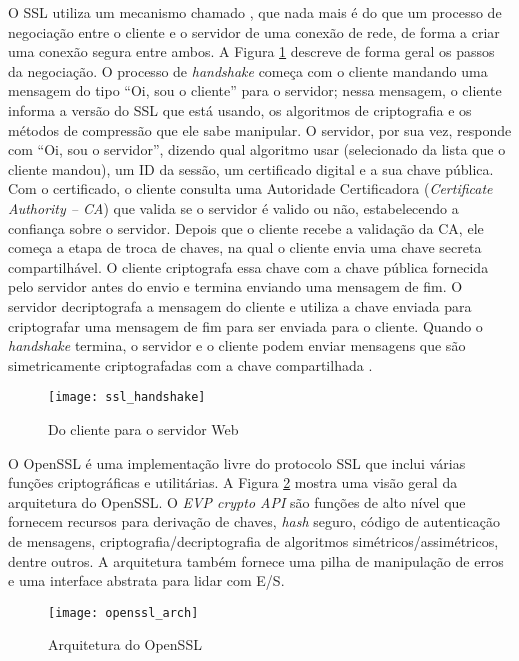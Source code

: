 O SSL utiliza um mecanismo chamado , que
nada mais é do que um processo de negociação entre o cliente e o servidor de uma conexão de rede, de
forma a criar uma conexão segura entre ambos. A Figura
\ref{fig:openssl_handshake} descreve de forma geral os passos da negociação. O
processo de \emph{handshake} começa com o cliente mandando uma mensagem do
tipo ``Oi, sou o cliente'' para o servidor; nessa mensagem, o cliente informa a
versão do SSL que está usando, os algoritmos de criptografia e os métodos de
compressão que ele sabe manipular. O servidor, por sua vez, responde com ``Oi, sou o
servidor'', dizendo qual algoritmo usar (selecionado da lista que o cliente
mandou), um ID da sessão, um certificado digital e a sua chave pública. Com o
certificado, o cliente consulta uma Autoridade Certificadora (\emph{Certificate Authority -- CA})
que valida se o servidor é valido ou não,
estabelecendo a confiança sobre o servidor. Depois que o cliente recebe a
validação da CA, ele começa a etapa de troca de chaves, na qual o cliente envia
uma chave secreta compartilhável. O cliente criptografa essa chave com a chave
pública fornecida pelo servidor antes do envio e termina enviando uma mensagem de
fim. O servidor decriptografa a mensagem do cliente e utiliza a chave enviada
para criptografar uma mensagem de fim para ser enviada para o cliente. Quando
o \emph{handshake} termina, o servidor e o cliente podem enviar mensagens que
são simetricamente criptografadas com a chave compartilhada \citep{openssl}.

\begin{figure}[!h]
  \centering
  \texttt{[image: ssl\_handshake]}
  \caption{Do cliente para o servidor Web}
  \label{fig:openssl_handshake}
\end{figure}

O OpenSSL é uma implementação livre do protocolo SSL que
inclui várias funções criptográficas e utilitárias. A Figura
\ref{fig:openssl_arch} mostra uma visão geral da arquitetura do OpenSSL. O
\emph{EVP crypto API} são funções de alto nível que fornecem recursos para
derivação de chaves, \emph{hash} seguro, código de autenticação de mensagens,
criptografia/decriptografia de algoritmos simétricos/assimétricos, dentre outros. A
arquitetura também fornece uma pilha de manipulação de erros e uma interface
abstrata para lidar com E/S.

\begin{figure}[!h]
  \centering
  \texttt{[image: openssl\_arch]}
  \caption[Arquitetura do OpenSSL]{Arquitetura do OpenSSL \citep{crypto_openssl}}
  \label{fig:openssl_arch}
\end{figure}

